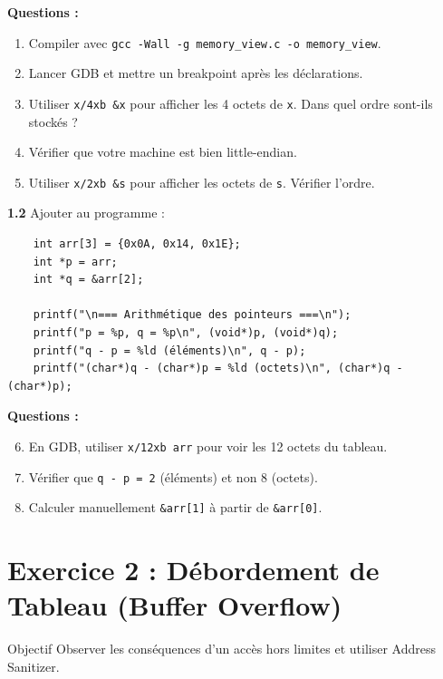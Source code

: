 \documentclass[10pt,a4paper]{article}
\begin{document}
\textbf{Questions :}
\begin{enumerate}[label=\alph*)]
    \item Compiler avec \texttt{gcc -Wall -g memory\_view.c -o memory\_view}.
    \item Lancer GDB et mettre un breakpoint après les déclarations.
    \item Utiliser \texttt{x/4xb \&x} pour afficher les 4 octets de \texttt{x}. Dans quel ordre sont-ils stockés ?
    \item Vérifier que votre machine est bien little-endian.
    \item Utiliser \texttt{x/2xb \&s} pour afficher les octets de \texttt{s}. Vérifier l'ordre.
\end{enumerate}

\textbf{1.2} Ajouter au programme :

\begin{lstlisting}
    int arr[3] = {0x0A, 0x14, 0x1E};
    int *p = arr;
    int *q = &arr[2];
    
    printf("\n=== Arithmétique des pointeurs ===\n");
    printf("p = %p, q = %p\n", (void*)p, (void*)q);
    printf("q - p = %ld (éléments)\n", q - p);
    printf("(char*)q - (char*)p = %ld (octets)\n", (char*)q - (char*)p);
\end{lstlisting}

\textbf{Questions :}
\begin{enumerate}[label=\alph*)]
    \setcounter{enumi}{5}
    \item En GDB, utiliser \texttt{x/12xb arr} pour voir les 12 octets du tableau.
    \item Vérifier que \texttt{q - p = 2} (éléments) et non 8 (octets).
    \item Calculer manuellement \texttt{\&arr[1]} à partir de \texttt{\&arr[0]}.
\end{enumerate}

\section{Exercice 2 : Débordement de Tableau (Buffer Overflow)}

\begin{exercicebox}{Objectif}
Observer les conséquences d'un accès hors limites et utiliser Address Sanitizer.
\end{exercicebox}
\end{document}
